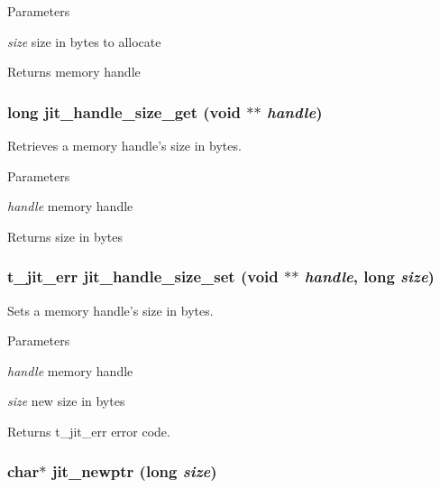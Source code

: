 \begin{DoxyParams}{Parameters}
\item[{\em size}]size in bytes to allocate\end{DoxyParams}
\begin{DoxyReturn}{Returns}
memory handle 
\end{DoxyReturn}
\hypertarget{group__memorymod_gac31e411720c7f4c3ed1d6d9e4bebd513}{
\subsubsection[{jit\_\-handle\_\-size\_\-get}]{\setlength{\rightskip}{0pt plus 5cm}long jit\_\-handle\_\-size\_\-get (void $\ast$$\ast$ {\em handle})}}
\label{group__memorymod_gac31e411720c7f4c3ed1d6d9e4bebd513}


Retrieves a memory handle's size in bytes. 
\begin{DoxyParams}{Parameters}
\item[{\em handle}]memory handle\end{DoxyParams}
\begin{DoxyReturn}{Returns}
size in bytes 
\end{DoxyReturn}
\hypertarget{group__memorymod_ga326dbdb81cd24ec26384845cd624af7b}{
\subsubsection[{jit\_\-handle\_\-size\_\-set}]{\setlength{\rightskip}{0pt plus 5cm}t\_\-jit\_\-err jit\_\-handle\_\-size\_\-set (void $\ast$$\ast$ {\em handle}, \/  long {\em size})}}
\label{group__memorymod_ga326dbdb81cd24ec26384845cd624af7b}


Sets a memory handle's size in bytes. 
\begin{DoxyParams}{Parameters}
\item[{\em handle}]memory handle \item[{\em size}]new size in bytes\end{DoxyParams}
\begin{DoxyReturn}{Returns}
t\_\-jit\_\-err error code. 
\end{DoxyReturn}
\hypertarget{group__memorymod_ga7c7f1fc4d1e935c154eb285c9216623b}{
\subsubsection[{jit\_\-newptr}]{\setlength{\rightskip}{0pt plus 5cm}char$\ast$ jit\_\-newptr (long {\em size})}}
\label{group__memorymod_ga7c7f1fc4d1e935c154eb285c9216623b}


